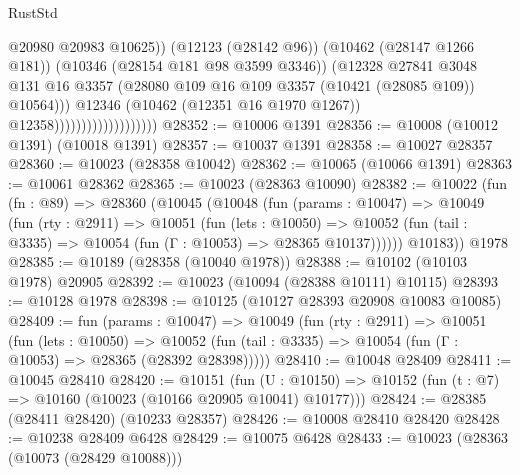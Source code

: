 \begin{lexlean}{RustStd}
\begin{coremodule}
                                                @20980
                                                @20983
                                                @10625))
                                            (@12123 (@28142 @96))
                                            (@10462 (@28147 @1266 @181))
                                            (@10346 (@28154 @181 @98 @3599 @3346))
                                            (@12328
                                              @27841
                                              @3048
                                              @131
                                              @16
                                              @3357
                                              (@28080
                                                @109
                                                @16
                                                @109
                                                @3357
                                                (@10421 (@28085 @109))
                                                @10564)))
                                          @12346
                                          (@10462 (@12351 @16 @1970 @1267))
                                          @12358)))))))))))))))))))
@28352 := @10006 @1391
@28356 := @10008 (@10012 @1391) (@10018 @1391)
@28357 := @10037 @1391
@28358 := @10027 @28357
@28360 := @10023 (@28358 @10042)
@28362 := @10065 (@10066 @1391)
@28363 := @10061 @28362
@28365 := @10023 (@28363 @10090)
@28382 := @10022
    (fun (fn : @89) =>
    @28360
      (@10045
        (@10048
          (fun (params : @10047) =>
          @10049
            (fun (rty : @2911) =>
            @10051
              (fun (lets : @10050) =>
              @10052 (fun (tail : @3335) => @10054 (fun (Γ : @10053) => @28365 @10137))))))
        @10183))
    @1978
@28385 := @10189 (@28358 (@10040 @1978))
@28388 := @10102 (@10103 @1978) @20905
@28392 := @10023 (@10094 (@28388 @10111) @10115)
@28393 := @10128 @1978
@28398 := @10125 (@10127 @28393 @20908 @10083 @10085)
@28409 := fun (params : @10047) =>
  @10049
    (fun (rty : @2911) =>
    @10051
      (fun (lets : @10050) =>
      @10052 (fun (tail : @3335) => @10054 (fun (Γ : @10053) => @28365 (@28392 @28398)))))
@28410 := @10048 @28409
@28411 := @10045 @28410
@28420 := @10151
    (fun (U : @10150) => @10152 (fun (t : @7) => @10160 (@10023 (@10166 @20905 @10041) @10177)))
@28424 := @28385 (@28411 @28420) (@10233 @28357)
@28426 := @10008 @28410 @28420
@28428 := @10238 @28409 @6428
@28429 := @10075 @6428
@28433 := @10023 (@28363 (@10073 (@28429 @10088)))

\end{coremodule}
\end{lexlean}
